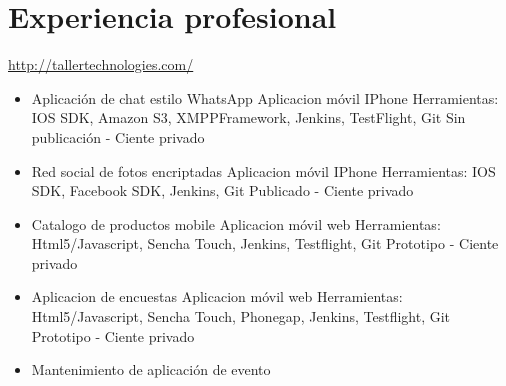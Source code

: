 \documentclass[11pt,a4paper]{moderncv}
\begin{document}
\section{Experiencia profesional}
{
    \url{http://tallertechnologies.com/}
    \begin{itemize}
        \item Aplicación de chat estilo WhatsApp
            \newline{}
            Aplicacion móvil IPhone
            \newline{}
            Herramientas: IOS SDK, Amazon S3, XMPPFramework, Jenkins, TestFlight, Git
            \newline{}
            Sin publicación - Ciente privado
            \newline{}
        \item Red social de fotos encriptadas
            \newline{}
            Aplicacion móvil IPhone
            \newline{}
            Herramientas: IOS SDK, Facebook SDK, Jenkins, Git
            \newline{}
            Publicado - Ciente privado
            \newline{}
        \item Catalogo de productos mobile
            \newline{}
            Aplicacion móvil web
            \newline{}
            Herramientas: Html5/Javascript, Sencha Touch, Jenkins, Testflight, Git
            \newline{}
            Prototipo - Ciente privado
            \newline{}
        \item Aplicacion de encuestas
            \newline{}
            Aplicacion móvil web
            \newline{}
            Herramientas: Html5/Javascript, Sencha Touch, Phonegap, Jenkins, Testflight, Git
            \newline{}
            Prototipo - Ciente privado
            \newline{}
        \item Mantenimiento de aplicación de evento

\end{itemize}}
\end{document}
